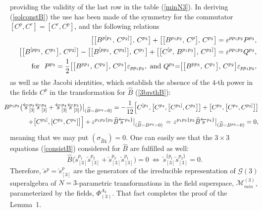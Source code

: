 \documentclass[10pt]{article}
\begin{document}
providing the validity of the last  row in the table (\ref{minN3}). In deriving (\ref{solconstB})
the use has been made of the symmetry for the commutator $[C^p,C^r]=[C^r,C^p]$,
and the following relations
\begin{eqnarray}
&& \big[\big[B^{p[p_1},\, C^{p_2]}\big],\,C^{p_3}\big] +  \big[\big[B^{p_1p_2},\, C^{p}\big],\,C^{p_3}\big]   =    \varepsilon^{pp_1p_2} P^{p_3}  ,     \label{ident1} \\
 && \big[\big[B^{[pp_3},\, C^{p_1}\big],\,C^{p_2]}\big] - \big[\big[B^{[pp_3},\, C^{p_2]}\big],\,C^{p_1}\big] + \big[\big[C^{[p},\,B^{p_1p_3}\big],\,C^{p_2]}\big]  =   \varepsilon^{pp_1p_2} Q^{p_3},   \label{ident2}\\
 && \mathrm{for }\  \ P^{p_3}  = \frac{1}{2} \big[\big[B^{pp_1},\, C^{p_2}\big],\,C^{p_3}\big] \varepsilon_{pp_1p_2}, \  \mathrm{and} \ Q^{p_3}  \hspace{-0.1cm} =  \hspace{-0.1cm} \big[\big[B^{pp_3},\, C^{p_1}\big],\,C^{p_2}\big] \varepsilon_{pp_1p_2} ,\label{aident3}
\end{eqnarray}
as well as the Jacobi identities, which establish the absence of the $4$-th power in the fields
$C^p$ in the transformation for $\widehat{B}$ (\ref{3brsthB}):
\begin{eqnarray}
& \hspace{-1em}& \hspace{-1em} B^{p_1p_2}\big(\overleftarrow{s}{}^{p_3}_{[3]}\overleftarrow{s}{}^{p_4}_{[3]}+\overleftarrow{s}{}^{p_4}_{[3]}\overleftarrow{s}{}^{p_3}_{[3]}\big)\big|_{(\widehat{B}=B^{pq}=0)} =  - \frac{1}{12} \Big[C^{[p_1}, \big[C^{p_4}, \big[C^{p_2]}, C^{p_3}\big] \big]+ \big[C^{p_3}, \big[ C^{p_4}, C^{p_2]}\big] \big]\nonumber \\
 & \hspace{-1em}&\hspace{-1em} \ +\big[C^{p_2]}, [C^{p_3}, C^{p_4}] \big]\Big] +  \varepsilon^{p_1p_2\{p_3}\widehat{B}  \overleftarrow{s}{}^{p_4\}}\big|_{(\widehat{B}=B^{pq}=0)}\, =\, \varepsilon^{p_1p_2\{p_3}\widehat{B}  \overleftarrow{s}{}^{p_4\}}\big|_{(\widehat{B}=B^{pq}=0)}=0 , \label{Jacobiid}
\end{eqnarray}
 meaning that we may put $(\sigma_{\widehat{B}4}) =0$. One can easily see that the $3\times 3$ equations (\ref{consistB}) considered
for $\widehat{B}$ are fulfilled as well:
\begin{equation}\label{consisttot}
  \widehat{B}\big(\overleftarrow{s}{}^{p_1}_{[3]}\overleftarrow{s}{}^{p_2}_{[3]}+\overleftarrow{s}{}^{p_2}_{[3]}\overleftarrow{s}{}^{p_1}_{[3]}\big) =0 \ \Leftrightarrow \  \overleftarrow{s}{}^{\{p_1}_{[3]}\overleftarrow{s}{}^{p_2\}}_{[3]} =0.
\end{equation}
Therefore, $\overleftarrow{s}{}^{p} = \overleftarrow{s}{}^{p}_{[3]}$ are the generators of the irreducible representation of  $\mathcal{G}(3)$ superalgebra
of $N=3$-parametric transformations
in the field superspace, $\mathcal{M}^{(3)}_{min}$, parameterized by the fields, $\Phi^{A_3}_{(3)}$.  That fact completes the proof of the Lemma~1.
\end{document}
